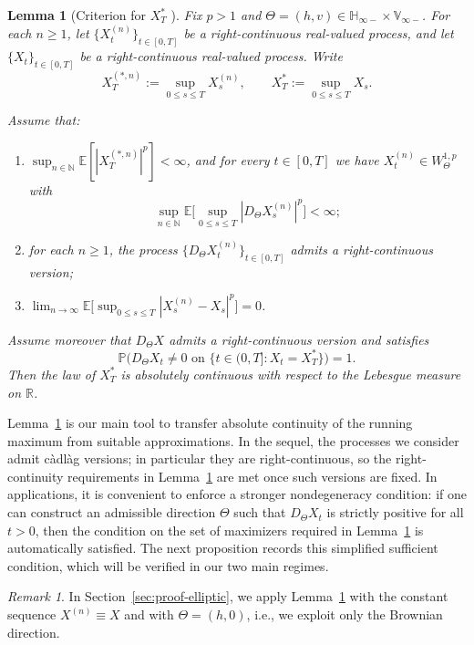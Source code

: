\documentclass[11pt]{article}
\newcommand{\R}{\mathbb{R}}
\newcommand{\E}{\mathbb{E}}
\newcommand{\Pbb}{\mathbb{P}}
\newcommand{\Hb}{\mathbb{H}}
\newcommand{\Vb}{\mathbb{V}}
\newcommand{\1}{\mathbf{1}}
\newcommand{\Xstar}{X^{\ast}}
\newcommand{\Xstarn}{X^{(\ast,n)}}
\theoremstyle{plain}
\newtheorem{lemma}[theorem]{Lemma}
\theoremstyle{definition}
\theoremstyle{remark}
\newtheorem{remark}[theorem]{Remark}
\begin{document}
\begin{lemma}[Criterion for $\Xstar_T$ {\cite[Lemma~4.1]{NakagawaSuzuki2024}}]\label{lem:criterion}
Fix $p>1$ and $\Theta=(h,v)\in \Hb_{\infty-}\times \Vb_{\infty-}$.
For each $n\ge1$, let $\{X^{(n)}_t\}_{t\in[0,T]}$ be a right-continuous real-valued process, and let $\{X_t\}_{t\in[0,T]}$ be a right-continuous real-valued process.
Write
\[
\Xstarn_T:=\sup_{0\le s\le T}X^{(n)}_s,
\qquad
\Xstar_T:=\sup_{0\le s\le T}X_s.
\]

Assume that:
\begin{enumerate}[label=\textup{(\roman*)},leftmargin=2.4em]
\item $\sup_{n\in\mathbb{N}}\E[|\Xstarn_T|^p]<\infty$, and for every $t\in[0,T]$ we have $X^{(n)}_t\in W^{1,p}_\Theta$ with
\[
\sup_{n\in\mathbb{N}}\E\Big[\sup_{0\le s\le T}|D_\Theta X^{(n)}_s|^p\Big]<\infty;
\]
\item for each $n\ge1$, the process $\{D_\Theta X^{(n)}_t\}_{t\in[0,T]}$ admits a right-continuous version;
\item $\displaystyle \lim_{n\to\infty}\E\Big[\sup_{0\le s\le T}|X^{(n)}_s-X_s|^p\Big]=0$.
\end{enumerate}
Assume moreover that $D_\Theta X$ admits a right-continuous version and satisfies
\[
\Pbb\big(D_\Theta X_t\neq 0 \text{ on }\{t\in(0,T]: X_t=\Xstar_T\}\big)=1.
\]
Then the law of $\Xstar_T$ is absolutely continuous with respect to the Lebesgue measure on $\R$.
\end{lemma}

\medskip
Lemma~\ref{lem:criterion} is our main tool to transfer absolute continuity of the running maximum from suitable approximations.
In the sequel, the processes we consider admit c\`adl\`ag versions; in particular they are right-continuous, so the right-continuity requirements in Lemma~\ref{lem:criterion} are met once such versions are fixed.
In applications, it is convenient to enforce a stronger nondegeneracy condition: if one can construct an admissible direction $\Theta$
such that $D_\Theta X_t$ is strictly positive for all $t>0$, then the condition on the set of maximizers required in Lemma~\ref{lem:criterion}
is automatically satisfied.
The next proposition records this simplified sufficient condition, which will be verified in our two main regimes.

\begin{remark}
In Section~\ref{sec:proof-elliptic}, we apply Lemma~\ref{lem:criterion} with the constant sequence $X^{(n)}\equiv X$
and with $\Theta=(h,0)$, i.e., we exploit only the Brownian direction.
\end{remark}
\end{document}
